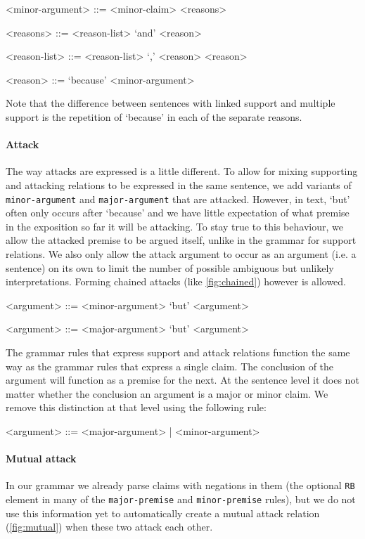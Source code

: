 \begin{grammar}
<minor-argument> ::= <minor-claim> <reasons>

<reasons> ::= <reason-list> `and' <reason>

<reason-list> ::= <reason-list> `,' <reason>
\alt <reason>

<reason> ::= `because' <minor-argument>
\end{grammar}

\noindent Note that the difference between sentences with linked support and multiple support is the repetition of `because' in each of the separate reasons.

\paragraph{Attack}
The way attacks are expressed is a little different. To allow for mixing supporting and attacking relations to be expressed in the same sentence, we add variants of \texttt{minor-argument} and \texttt{major-argument} that are attacked. However, in text, `but' often only occurs after `because' and we have little expectation of what premise in the exposition so far it will be attacking. To stay true to this behaviour, we allow the attacked premise to be argued itself, unlike in the grammar for support relations. We also only allow the attack argument to occur as an argument (i.e. a sentence) on its own to limit the number of possible ambiguous but unlikely interpretations. Forming chained attacks (like \autoref{fig:chained}) however is allowed.

\begin{grammar}
<argument> ::= <minor-argument> `but' <argument> %

<argument> ::= <major-argument> `but' <argument> %
\end{grammar}

\noindent The grammar rules that express support and attack relations function the same way as the grammar rules that express a single claim. The conclusion of the argument will function as a premise for the next. At the sentence level it does not matter whether the conclusion an argument is a major or minor claim. We remove this distinction at that level using the following rule:

\begin{grammar}
<argument> ::= <major-argument> | <minor-argument>
\end{grammar}

\paragraph{Mutual attack}
In our grammar we already parse claims with negations in them (the optional \texttt{RB} element in many of the \texttt{major-premise} and \texttt{minor-premise} rules), but we do not use this information yet to automatically create a mutual attack relation (\autoref{fig:mutual}) when these two attack each other.

